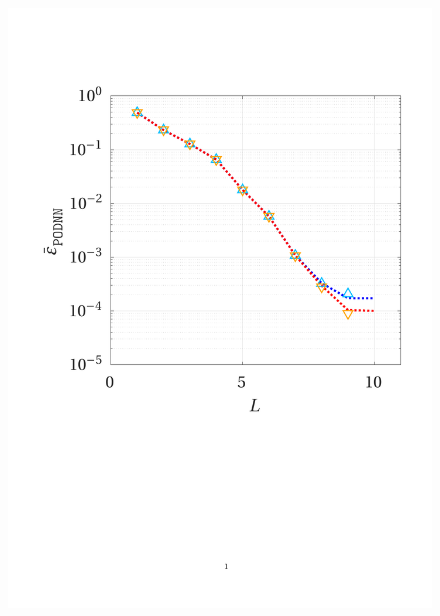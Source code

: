 \documentclass[12pt, a4paper, twoside, openright, notitlepage]{report}
\numberwithin{equation}{chapter}
\theoremstyle{theorem}
\theoremstyle{definition}
\theoremstyle{remark}
\theoremstyle{proposition}
\numberwithin{figure}{chapter}
\begin{document}
		\begin{figure}[H]
			\center
			\includegraphics[scale = 0.40, trim = {1cm 9cm 1cm 3cm}, clip]{poisson1d_3_nn_test}

\end{figure}
\end{document}

